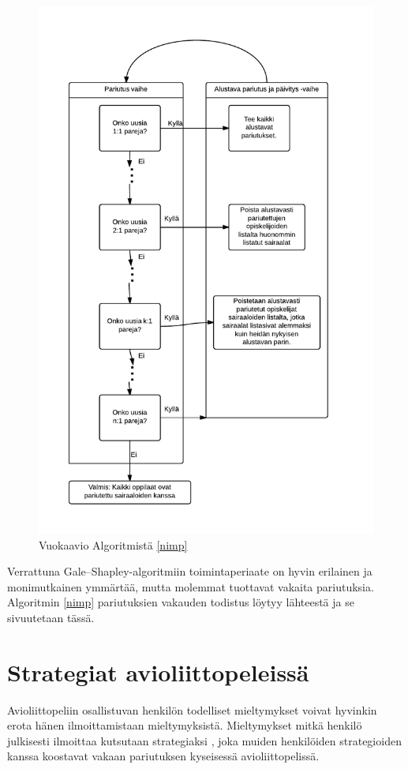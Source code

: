 \documentclass[finnish]{tktltiki2}
\theoremstyle{definition}
\theoremstyle{remark}
\begin{document}
\begin{figure}[H]
\includegraphics[scale=0.8]{NIMP}
\caption{Vuokaavio Algoritmistä \ref{nimp} \cite[s. 1009]{roth84}}
\label{nimp-vuo}
\end{figure}
Verrattuna Gale--Shapley-algoritmiin toimintaperiaate on hyvin erilainen ja monimutkainen ymmärtää, mutta molemmat tuottavat vakaita pariutuksia. Algoritmin \ref{nimp} pariutuksien vakauden todistus löytyy lähteestä ja se sivuutetaan tässä.

\section{Strategiat avioliittopeleissä}
Avioliittopeliin osallistuvan henkilön todelliset mieltymykset voivat hyvinkin erota hänen ilmoittamistaan mieltymyksistä. Mieltymykset mitkä henkilö julkisesti ilmoittaa kutsutaan strategiaksi \cite[s. 592]{Balinski}, joka muiden henkilöiden strategioiden kanssa koostavat vakaan pariutuksen kyseisessä avioliittopelissä.
\end{document}
